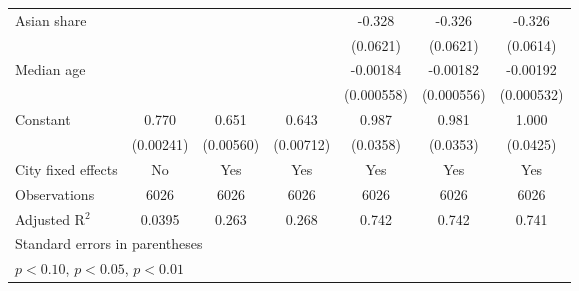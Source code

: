 {\begin{tabular}{l*{6}{c}}
\addlinespace
Asian share         &                     &                     &                     &      -0.328\sym{***}&      -0.326\sym{***}&      -0.326\sym{***}\\
                    &                     &                     &                     &    (0.0621)         &    (0.0621)         &    (0.0614)         \\
\addlinespace
Median age          &                     &                     &                     &    -0.00184\sym{***}&    -0.00182\sym{***}&    -0.00192\sym{***}\\
                    &                     &                     &                     &  (0.000558)         &  (0.000556)         &  (0.000532)         \\
\addlinespace
Constant            &       0.770\sym{***}&       0.651\sym{***}&       0.643\sym{***}&       0.987\sym{***}&       0.981\sym{***}&       1.000\sym{***}\\
                    &   (0.00241)         &   (0.00560)         &   (0.00712)         &    (0.0358)         &    (0.0353)         &    (0.0425)         \\
\midrule
City fixed effects  &          No         &         Yes         &         Yes         &         Yes         &         Yes         &         Yes         \\
Observations        &        6026         &        6026         &        6026         &        6026         &        6026         &        6026         \\
Adjusted R$^2$      &      0.0395         &       0.263         &       0.268         &       0.742         &       0.742         &       0.741         \\
\bottomrule
\multicolumn{7}{l}{\footnotesize Standard errors in parentheses}\\
\multicolumn{7}{l}{\footnotesize \sym{*} \(p<0.10\), \sym{**} \(p<0.05\), \sym{***} \(p<0.01\)}\\
\end{tabular}
}
